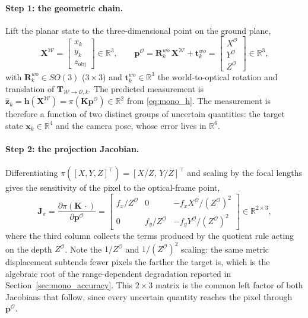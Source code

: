 \paragraph*{Step 1: the geometric chain.} Lift the planar state to the
three-dimensional point on the ground plane,
\begin{equation}
  \bm{X}^{\mathcal{W}} = \begin{bmatrix} x_k \\ y_k \\ z_{\mathrm{obj}} \end{bmatrix} \in\mathbb{R}^{3},
  \qquad
  \bm{p}^{\mathcal{O}} = \bm{R}^{wo}_k\,\bm{X}^{\mathcal{W}} + \bm{t}^{wo}_k
  = \begin{bmatrix} X^{\mathcal{O}} \\ Y^{\mathcal{O}} \\ Z^{\mathcal{O}} \end{bmatrix} \in\mathbb{R}^{3},
  \label{eq:mono_chain}
\end{equation}
with $\bm{R}^{wo}_k\in SO(3)$ ($3\times3$) and $\bm{t}^{wo}_k\in\mathbb{R}^3$ the
world-to-optical rotation and translation of
$\bm{T}_{\mathcal{W}\to\mathcal{O},k}$. The predicted measurement is
$\hat{\bm{z}}_k=\bm{h}(\bm{X}^{\mathcal{W}})=\pi(\bm{K}\bm{p}^{\mathcal{O}})\in\mathbb{R}^{2}$
from \eqref{eq:mono_h}. The measurement is therefore a function of two distinct
groups of uncertain quantities: the target state $\bm{x}_k\in\mathbb{R}^{4}$ and
the camera pose, whose error lives in $\mathbb{R}^{6}$.

\paragraph*{Step 2: the projection Jacobian.} Differentiating
$\pi([X,Y,Z]^{\top})=[X/Z,\,Y/Z]^{\top}$ and scaling by the focal lengths gives
the sensitivity of the pixel to the optical-frame point,
\begin{equation}
  \bm{J}_{\pi} = \frac{\partial \pi(\bm{K}\,\cdot)}{\partial \bm{p}^{\mathcal{O}}}
  = \begin{bmatrix}
      f_x/Z^{\mathcal{O}} & 0 & -f_x X^{\mathcal{O}}/(Z^{\mathcal{O}})^2 \\[2pt]
      0 & f_y/Z^{\mathcal{O}} & -f_y Y^{\mathcal{O}}/(Z^{\mathcal{O}})^2
    \end{bmatrix} \in \mathbb{R}^{2\times3},
  \label{eq:Jpi}
\end{equation}
where the third column collects the terms produced by the quotient rule acting on
the depth $Z^{\mathcal{O}}$. Note the $1/Z^{\mathcal{O}}$ and
$1/(Z^{\mathcal{O}})^{2}$ scaling: the same metric displacement subtends fewer
pixels the farther the target is, which is the algebraic root of the
range-dependent degradation reported in Section~\ref{sec:mono_accuracy}. This
$2\times3$ matrix is the common left factor of both Jacobians that follow, since
every uncertain quantity reaches the pixel through $\bm{p}^{\mathcal{O}}$.

